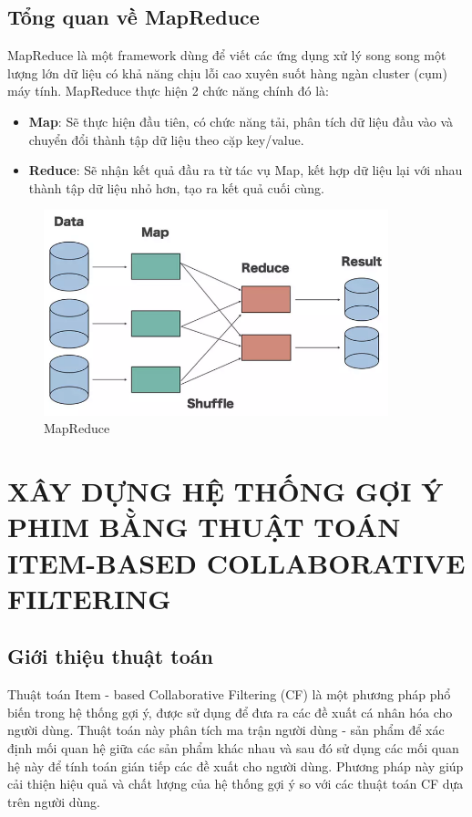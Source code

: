 \documentclass{report}
\begin{document}
\pagebreak
\section{Tổng quan về MapReduce}
MapReduce là một framework dùng để viết các ứng dụng xử lý song song
một lượng lớn dữ liệu có khả năng chịu lỗi cao xuyên suốt hàng ngàn
cluster (cụm) máy tính.
\vspace{0.5cm}
\newline
MapReduce thực hiện 2 chức năng chính đó là:
\begin{itemize}
    \item \textbf{Map}: Sẽ thực hiện đầu tiên, có chức năng tải,
          phân tích dữ liệu đầu vào và chuyển đổi thành tập
          dữ liệu theo cặp key/value.
    \item \textbf{Reduce}: Sẽ nhận kết quả đầu ra từ tác vụ Map,
          kết hợp dữ liệu lại với nhau thành tập dữ liệu nhỏ hơn, tạo ra
          kết quả cuối cùng.
\end{itemize}
\begin{figure}[h]
    \centering
    \includegraphics[width=10cm]{images/MapReduce.png}
    \caption{MapReduce}
\end{figure}

\chapter[XÂY DỰNG HỆ THỐNG GỢI Ý PHIM BẰNG THUẬT TOÁN ITEM-BASED COLLABORATIVE FILTERING]
 {\LARGE XÂY DỰNG HỆ THỐNG GỢI Ý PHIM BẰNG THUẬT TOÁN ITEM-BASED COLLABORATIVE FILTERING}

\section{Giới thiệu thuật toán}
Thuật toán Item - based Collaborative Filtering (CF) là một phương pháp
phổ biến trong hệ thống gợi ý, được sử dụng để đưa ra các đề xuất cá nhân
hóa cho người dùng.
\vspace{0.5cm}
\newline
Thuật toán này phân tích ma trận người dùng - sản phẩm
để xác định mối quan hệ giữa các sản phẩm khác nhau và sau đó sử dụng các
mối quan hệ này để tính toán gián tiếp các đề xuất cho người dùng.
\vspace{0.5cm}
\newline
Phương pháp này giúp cải thiện hiệu quả và chất lượng của hệ thống
gợi ý so với các thuật toán CF dựa trên người dùng.
\end{document}
